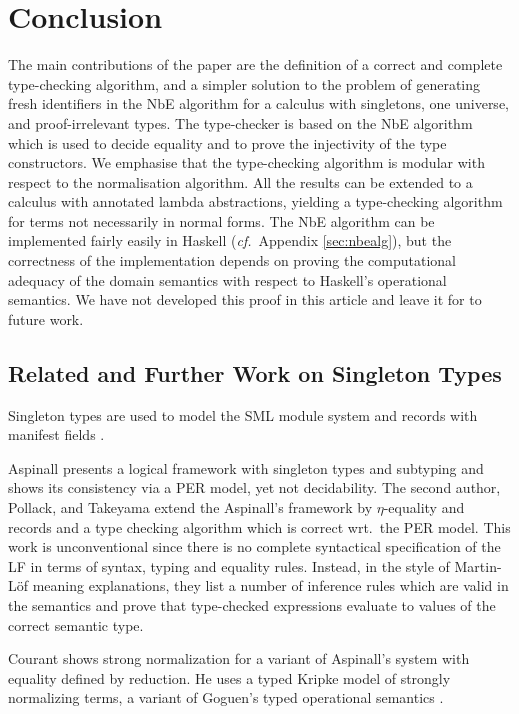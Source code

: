 \documentclass{LMCS}
\theoremstyle{plain}\newtheorem{satz}[thm]{Satz}
\def\cf{{\em cf.}}
\begin{document}
 
\section{Conclusion}

\noindent The main contributions of the paper are the definition of a correct
and complete type-checking algorithm, and a simpler solution to the
problem of generating fresh identifiers in the NbE algorithm for a
calculus with singletons, one universe, and proof-irrelevant
types. The type-checker is based on the NbE algorithm which is used to
decide equality and to prove the injectivity of the type
constructors. We emphasise that the type-checking algorithm is modular
with respect to the normalisation algorithm. All the results can be
extended to a calculus with annotated lambda abstractions, yielding a
type-checking algorithm for terms not necessarily in normal forms.
The NbE algorithm can be implemented fairly easily in Haskell (\cf\
Appendix \ref{sec:nbealg}), but the correctness of the implementation
depends on proving the computational adequacy of the domain semantics
with respect to Haskell's operational semantics. We have not developed
this proof in this article and leave it for to future work.




\subsection{Related and Further Work on Singleton Types}
\label{sec:related}

\noindent Singleton types are used to model the SML module system and records
with manifest fields \cite{coquandPollackTakeyama:fundinf05}.

Aspinall \cite{aspinall:csl94} presents a logical framework with
singleton types and subtyping and shows its consistency via a PER
model, yet not decidability.  
The second author, Pollack, and Takeyama
\cite{coquandPollackTakeyama:fundinf05} extend the Aspinall's
framework by $\eta$-equality and records and a type checking algorithm
which is correct wrt.\ the PER model. This work is unconventional since
there is no complete syntactical specification of the LF in terms of
syntax, typing and equality rules.  Instead, in the style of
Martin-L\"of meaning explanations, they list a number of inference
rules which are valid in the semantics and prove that type-checked
expressions evaluate to values of the correct semantic type.

Courant \cite{courant:itrs02} shows strong normalization for a variant of
Aspinall's system with equality defined by reduction.  He uses a
typed Kripke model of strongly normalizing terms, a variant of
Goguen's typed operational semantics \cite{goguen:PhD}.  
\end{document}
